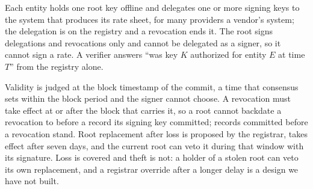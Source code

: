 \documentclass[10pt]{article}
\begin{document}
Each entity holds one root key offline and delegates one or more signing keys to the system that produces its rate sheet, for many providers a vendor's system; the delegation is on the registry and a revocation ends it. The root signs delegations and revocations only and cannot be delegated as a signer, so it cannot sign a rate. A verifier answers ``was key $K$ authorized for entity $E$ at time $T$'' from the registry alone.

Validity is judged at the block timestamp of the commit, a time that consensus sets within the block period and the signer cannot choose. A revocation must take effect at or after the block that carries it, so a root cannot backdate a revocation to before a record its signing key committed; records committed before a revocation stand. Root replacement after loss is proposed by the registrar, takes effect after seven days, and the current root can veto it during that window with its signature. Loss is covered and theft is not: a holder of a stolen root can veto its own replacement, and a registrar override after a longer delay is a design we have not built.
\end{document}
